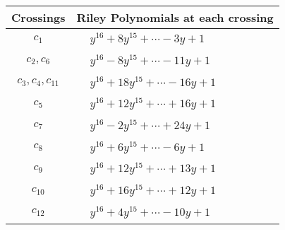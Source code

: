 \documentclass[1p]{elsarticle_modified}
\theoremstyle{definition}
\begin{document}
\begin{tabular}{m{50pt}|m{274pt}}
Crossings & \hspace{64pt}Riley Polynomials at each crossing \\
\hline $$\begin{aligned}c_{1}\end{aligned}$$&$\begin{aligned}
&y^{16}+8 y^{15}+\cdots-3 y+1
\end{aligned}$\\
\hline $$\begin{aligned}c_{2},c_{6}\end{aligned}$$&$\begin{aligned}
&y^{16}-8 y^{15}+\cdots-11 y+1
\end{aligned}$\\
\hline $$\begin{aligned}c_{3},c_{4},c_{11}\end{aligned}$$&$\begin{aligned}
&y^{16}+18 y^{15}+\cdots-16 y+1
\end{aligned}$\\
\hline $$\begin{aligned}c_{5}\end{aligned}$$&$\begin{aligned}
&y^{16}+12 y^{15}+\cdots+16 y+1
\end{aligned}$\\
\hline $$\begin{aligned}c_{7}\end{aligned}$$&$\begin{aligned}
&y^{16}-2 y^{15}+\cdots+24 y+1
\end{aligned}$\\
\hline $$\begin{aligned}c_{8}\end{aligned}$$&$\begin{aligned}
&y^{16}+6 y^{15}+\cdots-6 y+1
\end{aligned}$\\
\hline $$\begin{aligned}c_{9}\end{aligned}$$&$\begin{aligned}
&y^{16}+12 y^{15}+\cdots+13 y+1
\end{aligned}$\\
\hline $$\begin{aligned}c_{10}\end{aligned}$$&$\begin{aligned}
&y^{16}+16 y^{15}+\cdots+12 y+1
\end{aligned}$\\
\hline $$\begin{aligned}c_{12}\end{aligned}$$&$\begin{aligned}
&y^{16}+4 y^{15}+\cdots-10 y+1
\end{aligned}$\\
\hline
\end{tabular}\\~\\
\end{document}
